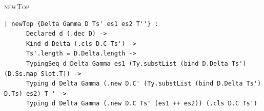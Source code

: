 \begin{cmp}{\textsc{newTop}}
\begin{paperside}
\end{paperside}
\begin{leanside}
\begin{lstlisting}[style=leanside]
  | newTop {Delta Gamma D Ts' es1 es2 T''} :
      Declared d (.dec D) ->
      Kind d Delta (.cls D.C Ts') ->
      Ts'.length = D.Delta.length ->
      TypingSeq d Delta Gamma es1 (Ty.substList (bind D.Delta Ts') (D.Ss.map Slot.T)) ->
      Typing d Delta Gamma (.new D.C' (Ty.substList (bind D.Delta Ts') D.Ts) es2) T'' ->
      Typing d Delta Gamma (.new D.C Ts' (es1 ++ es2)) (.cls D.C Ts')
\end{lstlisting}
\end{leanside}
\end{cmp}

